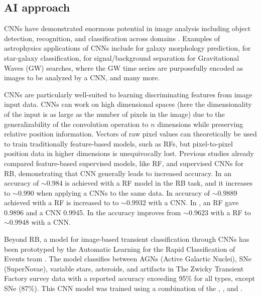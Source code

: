 \subsection{AI approach}\label{sec:AI}


CNNs have demonstrated enormous potential in image analysis including object detection, recognition, and classification across domains \citep{5206848}. Examples of astrophysics applications of CNNs include \citet{Dieleman_2015} for galaxy morphology prediction, \citet{Kim_2016} for star-galaxy classification, \citet{PhysRevLett.120.141103} for signal/background separation for Gravitational Waves (GW) searches, where the GW time series are purposefully encoded as images to be analyzed by a CNN, and many more.


CNNs are particularly well-suited to learning discriminating features from image input data. CNNs can work on high dimensional spaces (here the dimensionality of the input is as large as the number of pixels in the image) due to the generalizability of the convolution operation to $n$ dimensions while preserving relative position information. Vectors of raw pixel values can theoretically be used to train traditionally feature-based models, such as RFs, but pixel-to-pixel position data in higher dimensions is unequivocally lost. Previous studies already compared feature-based supervised models, like RF, and supervised CNNs for RB, demonstrating that CNN generally leads to increased accuracy.  In \cite{Gieseke_2017} an accuracy of $\sim0.984$ is achieved with a RF model in the RB task, and it increases to $\sim0.990$ when applying a CNNs to the same data. In \cite{Cabrera_2016}  accuracy of $\sim 0.9889$ achieved with a RF is increased to to $\sim0.9932$ with a CNN. In \cite{Cabrera_Vives_2017}, an RF gave 0.9896 and a CNN 0.9945. In \citet{Liu_2019} the accuracy improves from $\sim0.9623$ with a RF to $\sim0.9948$ with a CNN.

Beyond RB, a model for image-based transient classification through CNNs has been prototyped by the Automatic Learning for the Rapid Classification of Events team \citep[ALeRCE][]{carrascodavis2021alert}. The model classifies between AGNs (Active Galactic Nuclei), SNe (SuperNovae), variable stars, asteroids, and artifacts in The Zwicky Transient Factory \citep[ZTF]{Bellm_2018} survey data with a reported accuracy exceeding 95\% for all types, except SNe (87\%). This CNN model was trained using a combination of the \search, \temp, and \diff.%

